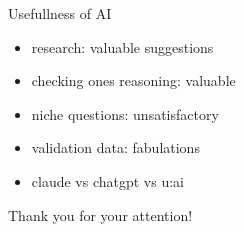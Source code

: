 \documentclass[aspectratio=169]{beamer}
\begin{document}
\begin{frame}{\Large Usefullness of AI}
  \Large
  \begin{itemize}
    \item research: valuable suggestions
    \item checking ones reasoning: valuable
    \item niche questions: unsatisfactory
    \item validation data: fabulations
    \item claude vs chatgpt vs u:ai
  \end{itemize}
\end{frame}


\begin{frame}[standout]
  Thank you for your attention!
\end{frame}
\end{document}

